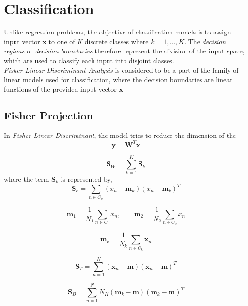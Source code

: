 \documentclass[12pt,twoside,a4paper]{article}
\begin{document}
\section{Classification}
Unlike regression problems, the objective of classification models is to assign input vector $\textbf{x}$ to one of \textit{K} discrete classes where $k = 1,...,K$. The \textit{decision regions} or \textit{decision boundaries} therefore represent the division of the input space, which are used to classify each input into disjoint classes.\\
\textit{Fisher Linear Discriminant Analysis} is considered to be a part of the family of linear models used for classification, where the decision boundaries are linear functions of the provided input vector $\textbf{x}$.
\subsection{Fisher Projection}
In \textit{Fisher Linear Discriminant}, the model tries to reduce the dimension of the
\begin{equation}
    \textbf{y} = \textbf{W}^T\textbf{x}
\end{equation}

\begin{equation}
    \textbf{S}_W = \sum_{k=1}^K\textbf{S}_k
\end{equation}
where the term $\textbf{S}_k$ is represented by,
\begin{equation}
    \textbf{S}_k = \sum_{n\in\textit{C}_k}(x_n - \textbf{m}_k)(x_n - \textbf{m}_k)^T
\end{equation}

\begin{equation}
    \textbf{m}_1 = \frac{1}{N_1}\sum_{n\in\textit{C}_1}x_n,\qquad \textbf{m}_2 = \frac{1}{N_2}\sum_{n\in\textit{C}_2}x_n
\end{equation}

\begin{equation}
    \textbf{m}_k = \frac{1}{N_k}\sum_{n\in\textit{C}_k}\textbf{x}_n
\end{equation}

\begin{equation}
    \textbf{S}_T = \sum_{n=1}^N(\textbf{x}_n - \textbf{m})(\textbf{x}_n - \textbf{m})^T
\end{equation}

\begin{equation}
    \textbf{S}_B = \sum_{n=1}^N N_K(\textbf{m}_k - \textbf{m})(\textbf{m}_k - \textbf{m})^T
\end{equation}
\end{document}
